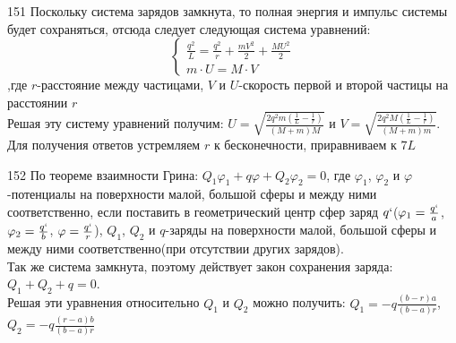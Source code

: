 \begin{Solution}{151}
Поскольку система зарядов замкнута, то полная энергия и импульс системы будет сохраняться, отсюда следует следующая система уравнений:
\begin{equation*}
\begin{cases}
\frac{q^2}{L}=\frac{q^2}{r}+\frac{m V^2}{2}+\frac{M U^2}{2} \\
m \cdot U=M \cdot V
\end{cases}
\end{equation*}
,где $r$-расстояние между частицами, $V$ и $U$-скорость первой и второй частицы на расстоянии $r$ \\
Решая эту систему уравнений получим: $U=\sqrt{\frac{2 q^2 m (\frac{1}{L}-\frac{1}{r})}{(M+m) M}}$ и $V=\sqrt{\frac{2 q^2 M (\frac{1}{L}-\frac{1}{r})}{(M+m)m}}$. Для получения ответов устремляем $r$ к бесконечности, приравниваем к $7L$
\end{Solution}
\begin{Solution}{152}
По теореме взаимности Грина: $Q_1\varphi_1+q\varphi+Q_2\varphi_2=0$, где $\varphi_1$, $\varphi_2$ и $\varphi$-потенциалы на поверхности малой, большой сферы и между ними соответственно, если поставить в геометрический центр сфер заряд $q`$($\varphi_1=\frac{q`}{a}$, $\varphi_2=\frac{q`}{b}$, $\varphi=\frac{q`}{r}$), $Q_1$, $Q_2$ и $q$-заряды на поверхности малой, большой сферы и между ними соответственно(при отсутствии других зарядов).\\ Так же система замкнута, поэтому действует закон сохранения заряда: $Q_1+Q_2+q=0$.\\
Решая эти уравнения относительно $Q_1$ и $Q_2$ можно получить: $Q_1=-q\frac{(b-r)a}{(b-a)r}$, $Q_2=-q\frac{(r-a)b}{(b-a)r}$
\end{Solution}
